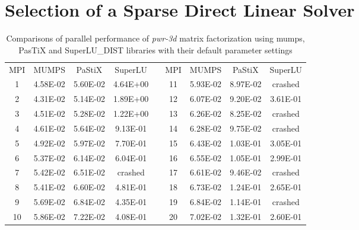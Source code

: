 \chapter{Selection of a Sparse Direct Linear Solver}
\label{app:app-lc}

\begin{table}[ht]
\centering
\begin{tabular}{|c|c|c|c|l|c|c|c|c|}
\cline{1-4} \cline{6-9}
MPI & MUMPS    & PaStiX   & SuperLU  &  & MPI & MUMPS    & PaStiX   & SuperLU  \\ \cline{1-4} \cline{6-9} 
1   & 4.58E-02 & 5.60E-02 & 4.64E+00 &  & 11  & 5.93E-02 & 8.97E-02 & crashed  \\ \cline{1-4} \cline{6-9} 
2   & 4.31E-02 & 5.14E-02 & 1.89E+00 &  & 12  & 6.07E-02 & 9.20E-02 & 3.61E-01 \\ \cline{1-4} \cline{6-9} 
3   & 4.51E-02 & 5.28E-02 & 1.22E+00 &  & 13  & 6.26E-02 & 8.25E-02 & crashed  \\ \cline{1-4} \cline{6-9} 
4   & 4.61E-02 & 5.64E-02 & 9.13E-01 &  & 14  & 6.28E-02 & 9.75E-02 & crashed  \\ \cline{1-4} \cline{6-9} 
5   & 4.92E-02 & 5.97E-02 & 7.70E-01 &  & 15  & 6.43E-02 & 1.03E-01 & 3.05E-01 \\ \cline{1-4} \cline{6-9} 
6   & 5.37E-02 & 6.14E-02 & 6.04E-01 &  & 16  & 6.55E-02 & 1.05E-01 & 2.99E-01 \\ \cline{1-4} \cline{6-9} 
7   & 5.42E-02 & 6.51E-02 & crashed  &  & 17  & 6.61E-02 & 9.46E-02 & crashed  \\ \cline{1-4} \cline{6-9} 
8   & 5.41E-02 & 6.60E-02 & 4.81E-01 &  & 18  & 6.73E-02 & 1.24E-01 & 2.65E-01 \\ \cline{1-4} \cline{6-9} 
9   & 5.69E-02 & 6.84E-02 & 4.35E-01 &  & 19  & 6.84E-02 & 1.14E-01 & crashed  \\ \cline{1-4} \cline{6-9} 
10  & 5.86E-02 & 7.22E-02 & 4.08E-01 &  & 20  & 7.02E-02 & 1.32E-01 & 2.60E-01 \\ \cline{1-4} \cline{6-9} 
\end{tabular}
\caption{Comparisons of parallel performance of  \textit{pwr-3d} matrix factorization using \acrshort{mumps}, PasTiX and SuperLU\_DIST libraries with their default parameter settings}
\label{table:app-lc-pwr-3d-result}
\end{table}

